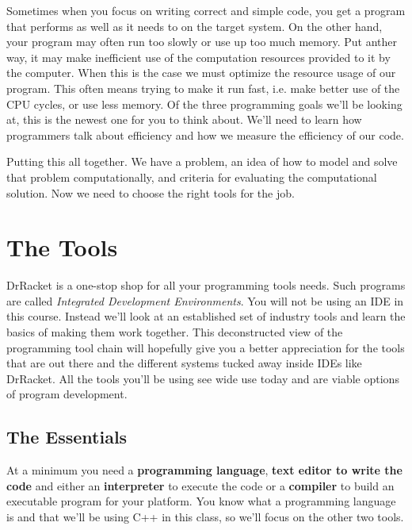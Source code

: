 \documentclass[]{tufte-handout}
\begin{document}
Sometimes when you focus on writing correct and simple code, you get a program that performs as well as it needs to on the target system. On the other hand, your program may often run too slowly or use up too much memory. Put anther way, it may make inefficient use of the computation resources provided to it by the computer.  When this is the case we must optimize the resource usage of our program.  This often means trying to make it run fast, i.e. make better use of the CPU cycles, or use less memory.  Of the three programming goals we'll be looking at, this is the newest one for you to think about.  We'll need to learn how programmers talk about efficiency and how we measure the efficiency of our code. 

Putting this all together. We have a problem, an idea of how to model and solve that problem computationally, and criteria for evaluating the computational solution. Now we need to choose the right tools for the job.
  
\section{The Tools}

DrRacket is a one-stop shop for all your programming tools needs.  Such programs are called \textit{Integrated Development Environments}. You will not be using an IDE in this course.  Instead we'll look at an established set of industry tools and learn the basics of making them work together.  This deconstructed view of the programming tool chain will hopefully give you a better appreciation for the tools that are out there and the different systems tucked away inside IDEs like DrRacket.  All the tools you'll be using see wide use today and are viable options of program development.  

\subsection{The Essentials}

At a minimum you need a \textbf{programming language}, \textbf{text editor to write the code} and either an \textbf{interpreter} to execute the code or a \textbf{compiler} to build an executable program for your platform. You know what a programming language is and that we'll be using C++ in this class, so we'll focus on the other two tools.
\end{document}
